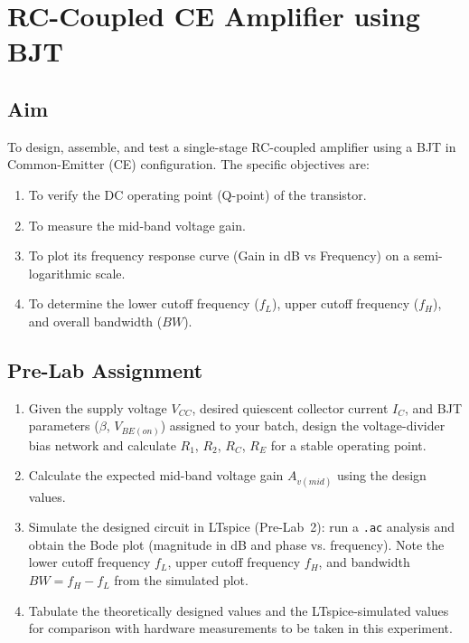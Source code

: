 %

\chapter{RC-Coupled CE Amplifier using BJT}
\label{chap:expt2}

\section{Aim}
To design, assemble, and test a single-stage RC-coupled amplifier using a BJT in Common-Emitter (CE) configuration. The specific objectives are:
\begin{enumerate}
	\item To verify the DC operating point (Q-point) of the transistor.
	\item To measure the mid-band voltage gain.
	\item To plot its frequency response curve (Gain in dB vs Frequency) on a semi-logarithmic scale.
	\item To determine the lower cutoff frequency ($f_L$), upper cutoff frequency ($f_H$), and overall bandwidth ($BW$).
\end{enumerate}  

\section{Pre-Lab Assignment}
\begin{enumerate}[label=(\roman*)]
	\item Given the supply voltage $V_{CC}$, desired quiescent collector current $I_C$, and BJT parameters ($\beta$, $V_{BE(on)}$) assigned to your batch, design the voltage-divider bias network and calculate $R_1$, $R_2$, $R_C$, $R_E$ for a stable operating point.
	\item Calculate the expected mid-band voltage gain $A_{v(mid)}$ using the design values.
	\item Simulate the designed circuit in LTspice (Pre-Lab~2): run a \texttt{.ac} analysis and obtain the Bode plot (magnitude in dB and phase vs. frequency). Note the lower cutoff frequency $f_L$, upper cutoff frequency $f_H$, and bandwidth $BW = f_H - f_L$ from the simulated plot.
	\item Tabulate the theoretically designed values and the LTspice-simulated values for comparison with hardware measurements to be taken in this experiment.
\end{enumerate}

